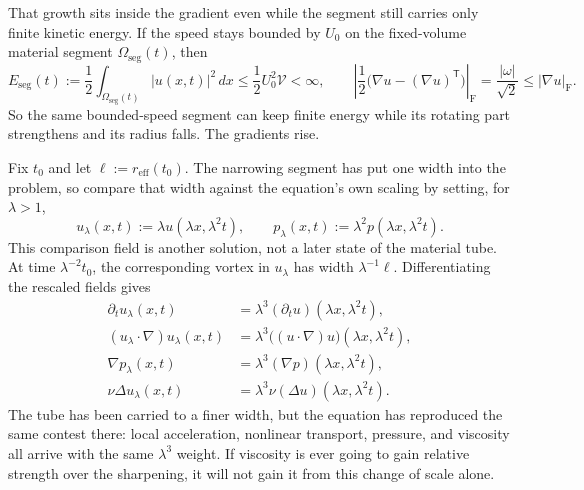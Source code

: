 That growth sits inside the gradient even while the segment still carries only finite kinetic energy. If the speed stays bounded by \(U_0\) on the fixed-volume material segment \(\Omega_{\mathrm{seg}}(t)\), then
\[
  E_{\mathrm{seg}}(t)
  :=
  \frac12\int_{\Omega_{\mathrm{seg}}(t)}|u(x,t)|^2\,dx
  \leq
  \frac12U_0^2\mathcal V
  <
  \infty,
  \qquad
  \left|\frac12\bigl(\nabla u-(\nabla u)^{\mathsf T}\bigr)\right|_{\mathrm F}
  =
  \frac{|\omega|}{\sqrt2}
  \leq
  |\nabla u|_{\mathrm F}.
\]
So the same bounded-speed segment can keep finite energy while its rotating part strengthens and its radius falls. The gradients rise.


Fix \(t_0\) and let \(\ell:=r_{\mathrm{eff}}(t_0)\). The narrowing segment has put one width into the problem, so compare that width against the equation's own scaling by setting, for \(\lambda>1\),
\[
  u_\lambda(x,t)
  :=
  \lambda u(\lambda x,\lambda^2t),
  \qquad
  p_\lambda(x,t)
  :=
  \lambda^2p(\lambda x,\lambda^2t).
\]
This comparison field is another solution, not a later state of the material tube. At time \(\lambda^{-2}t_0\), the corresponding vortex in \(u_\lambda\) has width \(\lambda^{-1}\ell\). Differentiating the rescaled fields gives
\[
\begin{aligned}
  \partial_tu_\lambda(x,t)
  &=
  \lambda^3(\partial_tu)(\lambda x,\lambda^2t),
  \\
  (u_\lambda\cdot\nabla)u_\lambda(x,t)
  &=
  \lambda^3\bigl((u\cdot\nabla)u\bigr)(\lambda x,\lambda^2t),
  \\
  \nabla p_\lambda(x,t)
  &=
  \lambda^3(\nabla p)(\lambda x,\lambda^2t),
  \\
  \nu\Delta u_\lambda(x,t)
  &=
  \lambda^3\nu(\Delta u)(\lambda x,\lambda^2t).
\end{aligned}
\]
The tube has been carried to a finer width, but the equation has reproduced the same contest there: local acceleration, nonlinear transport, pressure, and viscosity all arrive with the same \(\lambda^3\) weight. If viscosity is ever going to gain relative strength over the sharpening, it will not gain it from this change of scale alone.


